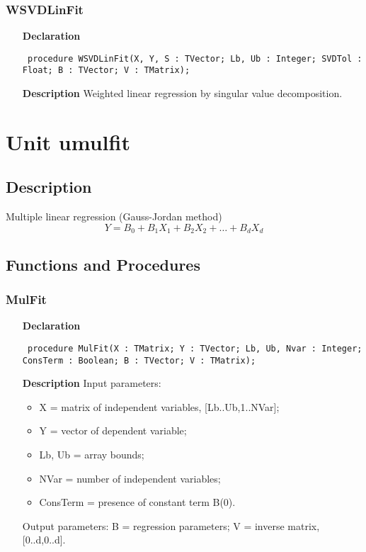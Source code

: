 \documentclass[12pt,a4paper,oneside]{report}
\newcommand{\declarationitem}[1]{\textbf{#1}}
\newcommand{\descriptiontitle}[1]{\textbf{#1}}
\newcommand{\code}[1]{\texttt{#1}}
\begin{document}
\subsubsection{WSVDLinFit}
\label{ulinfit-WSVDLinFit}
\begin{itemize}\item[\declarationitem{Declaration}\hfill]
	\begin{flushleft}
		\code{
			procedure WSVDLinFit(X, Y, S : TVector; Lb, Ub : Integer; SVDTol : Float; B : TVector; V : TMatrix);}
		
	\end{flushleft}
	
	\par
	\item[\descriptiontitle{Description}]
	Weighted linear regression by singular value decomposition.
	
\end{itemize}
\section{Unit umulfit}
\label{umulfit}
\subsection{Description}
Multiple linear regression (Gauss-Jordan method) 
$$Y = B_0 + B_1X_1 + B_2X_2 +\dots+ B_dX_d$$
\subsection{Functions and Procedures}
\subsubsection{MulFit}
\label{umulfit-MulFit}
\begin{itemize}\item[\declarationitem{Declaration}\hfill]
	\begin{flushleft}
		\code{
			procedure MulFit(X : TMatrix; Y : TVector; Lb, Ub, Nvar : Integer; ConsTerm : Boolean; B : TVector; V : TMatrix);}
		
	\end{flushleft}
	
	\par
	\item[\descriptiontitle{Description}]
	Input parameters: 
	\begin{itemize}
		\item X = matrix of independent variables, [Lb..Ub,1..NVar];
		\item Y = vector of dependent variable; 
		\item Lb, Ub = array bounds; 
		\item NVar = number of independent variables; 
		\item ConsTerm = presence of constant term B(0). 
	\end{itemize}
	Output parameters: B = regression parameters; V = inverse matrix, [0..d,0..d].
\end{itemize}
\end{document}
